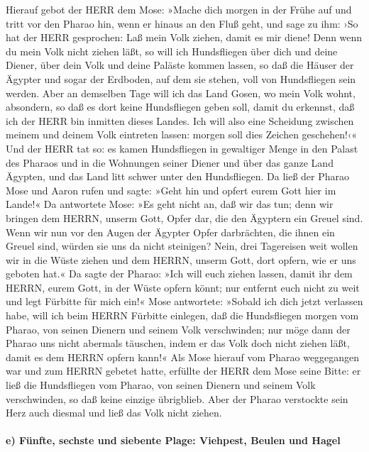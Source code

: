  Hierauf gebot der HERR dem Mose: »Mache dich morgen in
der Frühe auf und tritt vor den Pharao hin, wenn er hinaus an den Fluß
geht, und sage zu ihm: ›So hat der HERR gesprochen: Laß mein Volk
ziehen, damit es mir diene!  Denn wenn du mein Volk nicht
ziehen läßt, so will ich Hundsfliegen über dich und deine Diener, über
dein Volk und deine Paläste kommen lassen, so daß die Häuser der Ägypter
und sogar der Erdboden, auf dem sie stehen, voll von Hundsfliegen sein
werden.  Aber an demselben Tage will ich das Land Gosen,
wo mein Volk wohnt, absondern, so daß es dort keine Hundsfliegen geben
soll, damit du erkennst, daß ich der HERR bin inmitten dieses Landes.
 Ich will also eine Scheidung zwischen meinem und deinem
Volk eintreten lassen: morgen soll dies Zeichen geschehen!‹«
 Und der HERR tat so: es kamen Hundsfliegen in gewaltiger
Menge in den Palast des Pharaos und in die Wohnungen seiner Diener und
über das ganze Land Ägypten, und das Land litt schwer unter den
Hundsfliegen.  Da ließ der Pharao Mose und Aaron rufen
und sagte: »Geht hin und opfert eurem Gott hier im Lande!«
 Da antwortete Mose: »Es geht nicht an, daß wir das tun;
denn wir bringen dem HERRN, unserm Gott, Opfer dar, die den Ägyptern ein
Greuel sind. Wenn wir nun vor den Augen der Ägypter Opfer darbrächten,
die ihnen ein Greuel sind, würden sie uns da nicht steinigen?
 Nein, drei Tagereisen weit wollen wir in die Wüste
ziehen und dem HERRN, unserm Gott, dort opfern, wie er uns geboten hat.«
 Da sagte der Pharao: »Ich will euch ziehen lassen, damit
ihr dem HERRN, eurem Gott, in der Wüste opfern könnt; nur entfernt euch
nicht zu weit und legt Fürbitte für mich ein!«  Mose
antwortete: »Sobald ich dich jetzt verlassen habe, will ich beim HERRN
Fürbitte einlegen, daß die Hundsfliegen morgen vom Pharao, von seinen
Dienern und seinem Volk verschwinden; nur möge dann der Pharao uns nicht
abermals täuschen, indem er das Volk doch nicht ziehen läßt, damit es
dem HERRN opfern kann!«  Als Mose hierauf vom Pharao
weggegangen war und zum HERRN gebetet hatte,  erfüllte
der HERR dem Mose seine Bitte: er ließ die Hundsfliegen vom Pharao, von
seinen Dienern und seinem Volk verschwinden, so daß keine einzige
übrigblieb.  Aber der Pharao verstockte sein Herz auch
diesmal und ließ das Volk nicht ziehen.

\hypertarget{e-fuxfcnfte-sechste-und-siebente-plage-viehpest-beulen-und-hagel}{%
\paragraph{e) Fünfte, sechste und siebente Plage: Viehpest, Beulen und
Hagel}\label{e-fuxfcnfte-sechste-und-siebente-plage-viehpest-beulen-und-hagel}}

